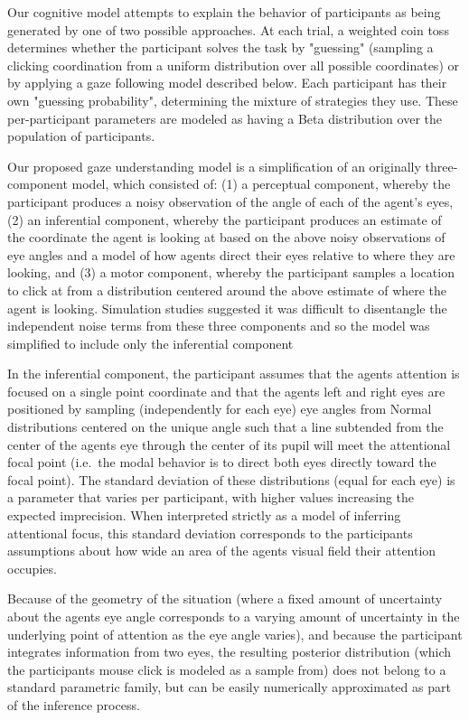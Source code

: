 \documentclass[
  man,floatsintext]{apa6}
\begin{document}
Our cognitive model attempts to explain the behavior of participants as being generated by one of two possible approaches.
At each trial, a weighted coin toss determines whether the participant solves the task by "guessing" (sampling a clicking coordination from a uniform distribution over all possible coordinates) or by applying a gaze following model described below.
Each participant has their own "guessing probability", determining the mixture of strategies they use.
These per-participant parameters are modeled as having a Beta distribution over the population of participants.

Our proposed gaze understanding model is a simplification of an originally three-component model, which consisted of: (1) a perceptual component, whereby the participant produces a noisy observation of the angle of each of the agent's eyes, (2) an inferential component, whereby the participant produces an estimate of the coordinate the agent is looking at based on the above noisy observations of eye angles and a model of how agents direct their eyes relative to where they are looking, and (3) a motor component, whereby the participant samples a location to click at from a distribution centered around the above estimate of where the agent is looking.
Simulation studies suggested it was difficult to disentangle the independent noise terms from these three components and so the model was simplified to include only the inferential component

In the inferential component, the participant assumes that the agent\textquotesingle s attention is focused on a single point coordinate and that the agent\textquotesingle s left and right eyes are positioned by sampling (independently for each eye) eye angles from Normal distributions centered on the unique angle such that a line subtended from the center of the agent\textquotesingle s eye through the center of its pupil will meet the attentional focal point (i.e.~the modal behavior is to direct both eyes directly toward the focal point).
The standard deviation of these distributions (equal for each eye) is a parameter that varies per participant, with higher values increasing the expected imprecision.
When interpreted strictly as a model of inferring attentional focus, this standard deviation corresponds to the participant\textquotesingle s assumptions about how wide an area of the agent\textquotesingle s visual field their attention occupies.

Because of the geometry of the situation (where a fixed amount of uncertainty about the agent\textquotesingle s eye angle corresponds to a varying amount of uncertainty in the underlying point of attention as the eye angle varies), and because the participant integrates information from two eyes, the resulting posterior distribution (which the participant\textquotesingle s mouse click is modeled as a sample from) does not belong to a standard parametric family, but can be easily numerically approximated as part of the inference process.
\end{document}
